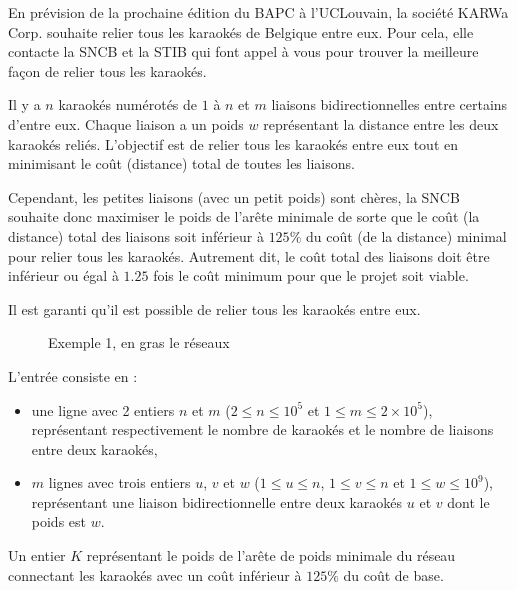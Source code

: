 \problemname{\problemyamlname}


En prévision de la prochaine édition du BAPC à l'UCLouvain, la société KARWa Corp. souhaite relier tous les karaokés de Belgique entre eux.
Pour cela, elle contacte la SNCB et la STIB qui font appel à vous pour trouver la meilleure façon de relier tous les karaokés.

Il y a $n$ karaokés numérotés de $1$ à $n$ et $m$ liaisons bidirectionnelles entre certains d'entre eux.
Chaque liaison a un poids $w$ représentant la distance entre les deux karaokés reliés.
L'objectif est de relier tous les karaokés entre eux tout en minimisant le coût (distance) total de toutes les liaisons.

Cependant, les petites liaisons (avec un petit poids) sont chères, la SNCB souhaite donc maximiser le poids de l'arête minimale de sorte que le coût (la distance) total des liaisons soit inférieur à $125\%$ du coût (de la distance) minimal pour relier tous les karaokés.
Autrement dit, le coût total des liaisons doit être inférieur ou égal à $1.25$ fois le coût minimum pour que le projet soit viable.

Il est garanti qu'il est possible de relier tous les karaokés entre eux.

\begin{figure}[h]
	\centering
	  \caption[]{Exemple 1, en gras le réseaux}
\end{figure}

\begin{Input}
	L'entrée consiste en :
	\begin{itemize}
		\item une ligne avec 2 entiers $n$ et $m$ ($2 \le n \le 10^5$ et $1 \le m \le 2 \times 10^5$), représentant respectivement le nombre de karaokés et le nombre de liaisons entre deux karaokés,
		\item $m$ lignes avec trois entiers $u$, $v$ et $w$ ($1 \le u \le n$, $1 \le v \le n$ et $1 \le w \le 10^9$), représentant une liaison bidirectionnelle entre deux karaokés $u$ et $v$ dont le poids est $w$.
	\end{itemize}
\end{Input}

\begin{Output}
	Un entier $K$ représentant le poids de l'arête de poids minimale du réseau connectant les karaokés avec un coût inférieur à $125\%$ du coût de base.
\end{Output}
